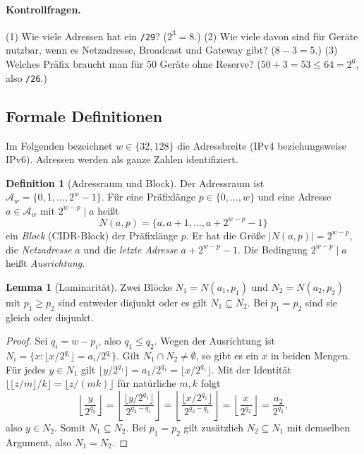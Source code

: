 \documentclass[a4paper,12pt]{article}
\theoremstyle{definition}
\newtheorem{definition}{Definition}
\newtheorem{lemma}{Lemma}
\begin{document}
\paragraph{Kontrollfragen.} (1) Wie viele Adressen hat ein \texttt{/29}? ($2^3 = 8$.) (2) Wie viele davon sind für Geräte nutzbar, wenn es Netzadresse, Broadcast und Gateway gibt? ($8-3=5$.) (3) Welches Präfix braucht man für 50 Geräte ohne Reserve? ($50+3 = 53 \le 64 = 2^6$, also \texttt{/26}.)

\subsection{Formale Definitionen}

Im Folgenden bezeichnet $w \in \{32, 128\}$ die Adressbreite (IPv4 beziehungsweise IPv6). Adressen werden als ganze Zahlen identifiziert.

\begin{definition}[Adressraum und Block]
	Der Adressraum ist $\mathcal{A}_w = \{0, 1, \ldots, 2^w - 1\}$. Für eine Präfixlänge $p \in \{0,\ldots,w\}$ und eine Adresse $a \in \mathcal{A}_w$ mit $2^{w-p} \mid a$ heißt
	\[
	N(a,p) = \{a, a+1, \ldots, a + 2^{w-p} - 1\}
	\]
	ein \emph{Block} (CIDR-Block) der Präfixlänge $p$. Er hat die Größe $|N(a,p)| = 2^{w-p}$, die \emph{Netzadresse} $a$ und die \emph{letzte Adresse} $a + 2^{w-p} - 1$. Die Bedingung $2^{w-p} \mid a$ heißt \emph{Ausrichtung}.
\end{definition}

\begin{lemma}[Laminarität]
\label{lem:laminar}
	Zwei Blöcke $N_1 = N(a_1,p_1)$ und $N_2 = N(a_2,p_2)$ mit $p_1 \ge p_2$ sind entweder disjunkt oder es gilt $N_1 \subseteq N_2$. Bei $p_1 = p_2$ sind sie gleich oder disjunkt.
\end{lemma}

\begin{proof}
	Sei $q_i = w - p_i$, also $q_1 \le q_2$. Wegen der Ausrichtung ist $N_i = \{x : \lfloor x / 2^{q_i} \rfloor = a_i / 2^{q_i}\}$. Gilt $N_1 \cap N_2 \neq \emptyset$, so gibt es ein $x$ in beiden Mengen. Für jedes $y \in N_1$ gilt $\lfloor y/2^{q_1}\rfloor = a_1/2^{q_1} = \lfloor x/2^{q_1}\rfloor$. Mit der Identität $\lfloor \lfloor z/m \rfloor / k \rfloor = \lfloor z/(mk) \rfloor$ für natürliche $m,k$ folgt
	\[
	\left\lfloor \frac{y}{2^{q_2}} \right\rfloor = \left\lfloor \frac{\lfloor y/2^{q_1}\rfloor}{2^{q_2-q_1}} \right\rfloor = \left\lfloor \frac{\lfloor x/2^{q_1}\rfloor}{2^{q_2-q_1}} \right\rfloor = \left\lfloor \frac{x}{2^{q_2}} \right\rfloor = \frac{a_2}{2^{q_2}},
	\]
	also $y \in N_2$. Somit $N_1 \subseteq N_2$. Bei $p_1 = p_2$ gilt zusätzlich $N_2 \subseteq N_1$ mit demselben Argument, also $N_1 = N_2$.
\end{proof}
\end{document}
